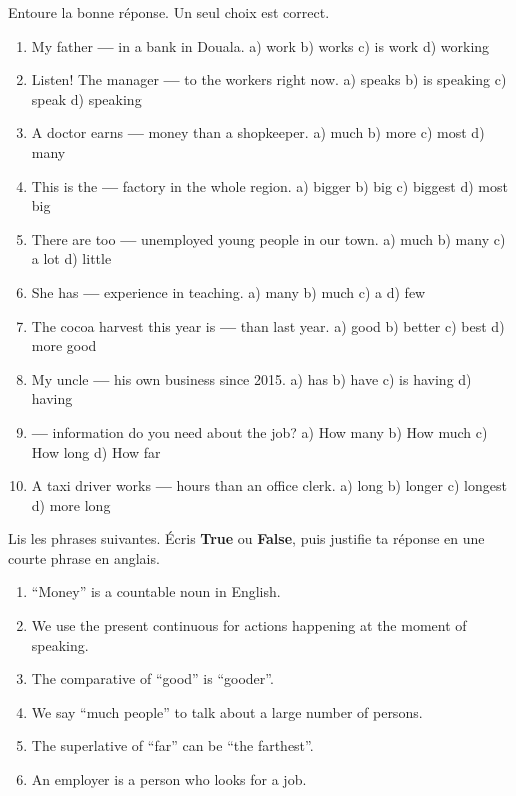\documentclass[11pt]{article}
\begin{document}
\begin{exercice}
Entoure la bonne réponse. Un seul choix est correct.
\begin{enumerate}
\item My father \textbf{---} in a bank in Douala. \quad a) work \quad b) works \quad c) is work \quad d) working
\item Listen! The manager \textbf{---} to the workers right now. \quad a) speaks \quad b) is speaking \quad c) speak \quad d) speaking
\item A doctor earns \textbf{---} money than a shopkeeper. \quad a) much \quad b) more \quad c) most \quad d) many
\item This is the \textbf{---} factory in the whole region. \quad a) bigger \quad b) big \quad c) biggest \quad d) most big
\item There are too \textbf{---} unemployed young people in our town. \quad a) much \quad b) many \quad c) a lot \quad d) little
\item She has \textbf{---} experience in teaching. \quad a) many \quad b) much \quad c) a \quad d) few
\item The cocoa harvest this year is \textbf{---} than last year. \quad a) good \quad b) better \quad c) best \quad d) more good
\item My uncle \textbf{---} his own business since 2015. \quad a) has \quad b) have \quad c) is having \quad d) having
\item \textbf{---} information do you need about the job? \quad a) How many \quad b) How much \quad c) How long \quad d) How far
\item A taxi driver works \textbf{---} hours than an office clerk. \quad a) long \quad b) longer \quad c) longest \quad d) more long
\end{enumerate}
\end{exercice}

\begin{exercice}
Lis les phrases suivantes. Écris \textbf{True} ou \textbf{False}, puis justifie ta réponse en une courte phrase en anglais.
\begin{enumerate}
\item “Money” is a countable noun in English.
\item We use the present continuous for actions happening at the moment of speaking.
\item The comparative of “good” is “gooder”.
\item We say “much people” to talk about a large number of persons.
\item The superlative of “far” can be “the farthest”.
\item An employer is a person who looks for a job.
\end{enumerate}
\end{exercice}
\end{document}
